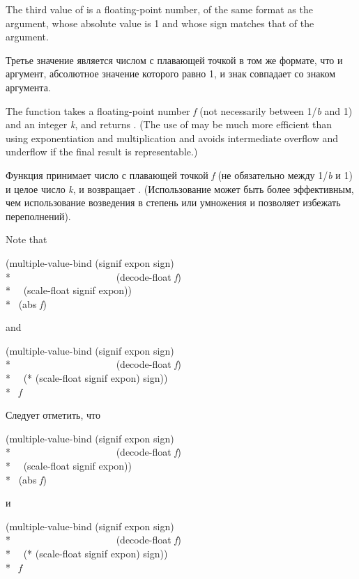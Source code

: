 \begin{defun}[Function]
The third value of  is a floating-point number,
of the same format as the argument, whose absolute value is 1
and whose sign matches that of the argument.

Третье значение  является числом с плавающей точкой в том же
формате, что и аргумент, абсолютное значение которого равно 1, и знак совпадает
со знаком аргумента.

The function  takes a floating-point number \emph{f}
(not necessarily between 1/\emph{b} and 1) and
an integer \emph{k}, and returns .
(The use of  may be much more efficient than using
exponentiation and multiplication and avoids intermediate
overflow and underflow if the final result is representable.)

Функция  принимает число с плавающей точкой \emph{f} (не
обязательно между 1/\emph{b} и 1) и целое число \emph{k}, и возвращает .
(Использование  может быть более эффективным, чем использование
возведения в степень или умножения и позволяет избежать переполнений).

Note that
\begin{lisp}
(multiple-value-bind (signif expon sign) \\*
~~~~~~~~~~~~~~~~~~~~~(decode-float \emph{f}) \\*
~~(scale-float signif expon)) \\*
\EQ\ (abs \emph{f})
\end{lisp}
and
\begin{lisp}
(multiple-value-bind (signif expon sign) \\*
~~~~~~~~~~~~~~~~~~~~~(decode-float \emph{f}) \\*
~~(* (scale-float signif expon) sign)) \\*
\EQ\ \emph{f}
\end{lisp}

Следует отметить, что
\begin{lisp}
(multiple-value-bind (signif expon sign) \\*
~~~~~~~~~~~~~~~~~~~~~(decode-float \emph{f}) \\*
~~(scale-float signif expon)) \\*
\EQ\ (abs \emph{f})
\end{lisp}
и
\begin{lisp}
(multiple-value-bind (signif expon sign) \\*
~~~~~~~~~~~~~~~~~~~~~(decode-float \emph{f}) \\*
~~(* (scale-float signif expon) sign)) \\*
\EQ\ \emph{f}
\end{lisp}


\end{defun}
